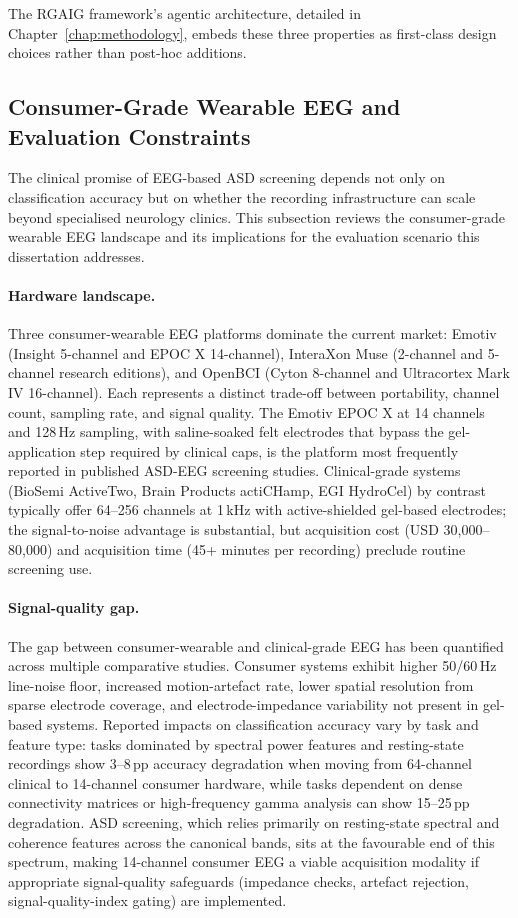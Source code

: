 \noindent The RGAIG framework's agentic architecture, detailed in Chapter~\ref{chap:methodology}, embeds these three properties as first-class design choices rather than post-hoc additions.

\subsection{Consumer-Grade Wearable EEG and Evaluation Constraints}
\label{subsec:wearable_eeg}

The clinical promise of EEG-based ASD screening depends not only on classification accuracy but on whether the recording infrastructure can scale beyond specialised neurology clinics. This subsection reviews the consumer-grade wearable EEG landscape and its implications for the evaluation scenario this dissertation addresses.

\paragraph{Hardware landscape.}
Three consumer-wearable EEG platforms dominate the current market: Emotiv (Insight 5-channel and EPOC X 14-channel), InteraXon Muse (2-channel and 5-channel research editions), and OpenBCI (Cyton 8-channel and Ultracortex Mark IV 16-channel). Each represents a distinct trade-off between portability, channel count, sampling rate, and signal quality. The Emotiv EPOC X at 14 channels and 128\,Hz sampling, with saline-soaked felt electrodes that bypass the gel-application step required by clinical caps, is the platform most frequently reported in published ASD-EEG screening studies. Clinical-grade systems (BioSemi ActiveTwo, Brain Products actiCHamp, EGI HydroCel) by contrast typically offer 64--256 channels at 1\,kHz with active-shielded gel-based electrodes; the signal-to-noise advantage is substantial, but acquisition cost (USD 30{,}000--80{,}000) and acquisition time (45+ minutes per recording) preclude routine screening use.

\paragraph{Signal-quality gap.}
The gap between consumer-wearable and clinical-grade EEG has been quantified across multiple comparative studies. Consumer systems exhibit higher 50/60\,Hz line-noise floor, increased motion-artefact rate, lower spatial resolution from sparse electrode coverage, and electrode-impedance variability not present in gel-based systems. Reported impacts on classification accuracy vary by task and feature type: tasks dominated by spectral power features and resting-state recordings show 3--8\,pp accuracy degradation when moving from 64-channel clinical to 14-channel consumer hardware, while tasks dependent on dense connectivity matrices or high-frequency gamma analysis can show 15--25\,pp degradation. ASD screening, which relies primarily on resting-state spectral and coherence features across the canonical bands, sits at the favourable end of this spectrum, making 14-channel consumer EEG a viable acquisition modality if appropriate signal-quality safeguards (impedance checks, artefact rejection, signal-quality-index gating) are implemented.

